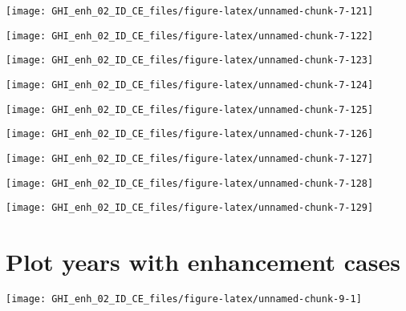 \documentclass[
  10pt,
  a4paper,oneside]{article}
\begin{document}
\begin{center}\texttt{[image: GHI\_enh\_02\_ID\_CE\_files/figure-latex/unnamed-chunk-7-121]} \end{center}

\begin{center}\texttt{[image: GHI\_enh\_02\_ID\_CE\_files/figure-latex/unnamed-chunk-7-122]} \end{center}

\begin{center}\texttt{[image: GHI\_enh\_02\_ID\_CE\_files/figure-latex/unnamed-chunk-7-123]} \end{center}

\begin{center}\texttt{[image: GHI\_enh\_02\_ID\_CE\_files/figure-latex/unnamed-chunk-7-124]} \end{center}

\begin{center}\texttt{[image: GHI\_enh\_02\_ID\_CE\_files/figure-latex/unnamed-chunk-7-125]} \end{center}

\begin{center}\texttt{[image: GHI\_enh\_02\_ID\_CE\_files/figure-latex/unnamed-chunk-7-126]} \end{center}

\begin{center}\texttt{[image: GHI\_enh\_02\_ID\_CE\_files/figure-latex/unnamed-chunk-7-127]} \end{center}

\begin{center}\texttt{[image: GHI\_enh\_02\_ID\_CE\_files/figure-latex/unnamed-chunk-7-128]} \end{center}

\begin{center}\texttt{[image: GHI\_enh\_02\_ID\_CE\_files/figure-latex/unnamed-chunk-7-129]} \end{center}

\newpage
\FloatBarrier

\hypertarget{plot-years-with-enhancement-cases}{%
\section{Plot years with enhancement cases}\label{plot-years-with-enhancement-cases}}

\begin{center}\texttt{[image: GHI\_enh\_02\_ID\_CE\_files/figure-latex/unnamed-chunk-9-1]} \end{center}
\end{document}
